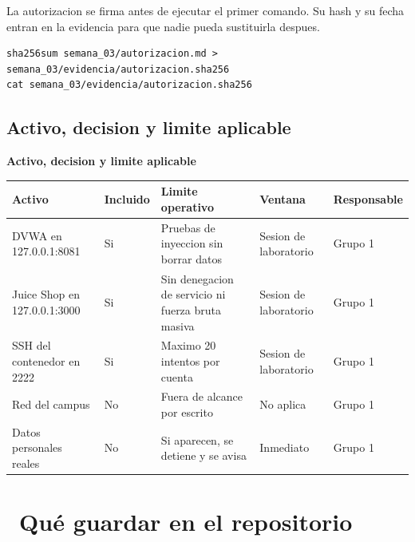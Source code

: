 \documentclass[11pt,a4paper]{article}
\newcommand{\iconotexto}[2]{\textcolor{cyanNeon}{\faIcon{#1}}~#2}
\begin{document}
La autorizacion se firma antes de ejecutar el primer comando. Su hash y su fecha entran en la evidencia para que nadie pueda sustituirla despues.

\begin{lstlisting}[style=estiloCodigo]
sha256sum semana_03/autorizacion.md > semana_03/evidencia/autorizacion.sha256
cat semana_03/evidencia/autorizacion.sha256
\end{lstlisting}

\subsection{Activo, decision y limite aplicable}

\begin{center}
\begin{minipage}{\linewidth}
\centering
{\footnotesize
\textbf{Activo, decision y limite aplicable}\par\smallskip
\begin{tabular}{@{}>{\raggedright\arraybackslash}p{2.80cm}>{\raggedright\arraybackslash}p{1.90cm}>{\raggedright\arraybackslash}p{4.20cm}>{\raggedright\arraybackslash}p{2.80cm}>{\raggedright\arraybackslash}p{2.60cm}@{}}
\toprule
\textbf{Activo} & \textbf{Incluido} & \textbf{Limite operativo} & \textbf{Ventana} & \textbf{Responsable} \\
\midrule
DVWA en 127.0.0.1:8081 & Si & Pruebas de inyeccion sin borrar datos & Sesion de laboratorio & Grupo 1 \\
Juice Shop en 127.0.0.1:3000 & Si & Sin denegacion de servicio ni fuerza bruta masiva & Sesion de laboratorio & Grupo 1 \\
SSH del contenedor en 2222 & Si & Maximo 20 intentos por cuenta & Sesion de laboratorio & Grupo 1 \\
Red del campus & No & Fuera de alcance por escrito & No aplica & Grupo 1 \\
Datos personales reales & No & Si aparecen, se detiene y se avisa & Inmediato & Grupo 1 \\
\bottomrule
\end{tabular}
}
\par{}
\end{minipage}
\end{center}

\section{\iconotexto{box-open}{Qué guardar en el repositorio}}
\end{document}
